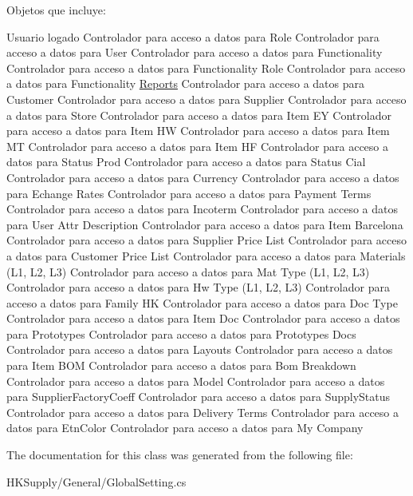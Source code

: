 Objetos que incluye\+:
\begin{DoxyItemize}
\item Usuario logado Controlador para acceso a datos para Role Controlador para acceso a datos para User Controlador para acceso a datos para Functionality Controlador para acceso a datos para Functionality Role Controlador para acceso a datos para Functionality \mbox{\hyperlink{namespace_h_k_supply_1_1_reports}{Reports}} Controlador para acceso a datos para Customer Controlador para acceso a datos para Supplier Controlador para acceso a datos para Store Controlador para acceso a datos para Item EY Controlador para acceso a datos para Item HW Controlador para acceso a datos para Item MT Controlador para acceso a datos para Item HF Controlador para acceso a datos para Status Prod Controlador para acceso a datos para Status Cial Controlador para acceso a datos para Currency Controlador para acceso a datos para Echange Rates Controlador para acceso a datos para Payment Terms Controlador para acceso a datos para Incoterm Controlador para acceso a datos para User Attr Description Controlador para acceso a datos para Item Barcelona Controlador para acceso a datos para Supplier Price List Controlador para acceso a datos para Customer Price List Controlador para acceso a datos para Materials (L1, L2, L3) Controlador para acceso a datos para Mat Type (L1, L2, L3) Controlador para acceso a datos para Hw Type (L1, L2, L3) Controlador para acceso a datos para Family HK Controlador para acceso a datos para Doc Type Controlador para acceso a datos para Item Doc Controlador para acceso a datos para Prototypes Controlador para acceso a datos para Prototypes Docs Controlador para acceso a datos para Layouts Controlador para acceso a datos para Item B\+OM Controlador para acceso a datos para Bom Breakdown Controlador para acceso a datos para Model Controlador para acceso a datos para Supplier\+Factory\+Coeff Controlador para acceso a datos para Supply\+Status Controlador para acceso a datos para Delivery Terms Controlador para acceso a datos para Etn\+Color Controlador para acceso a datos para My Company 
\end{DoxyItemize}

The documentation for this class was generated from the following file\+:\begin{DoxyCompactItemize}
\item 
H\+K\+Supply/\+General/Global\+Setting.\+cs\end{DoxyCompactItemize}
